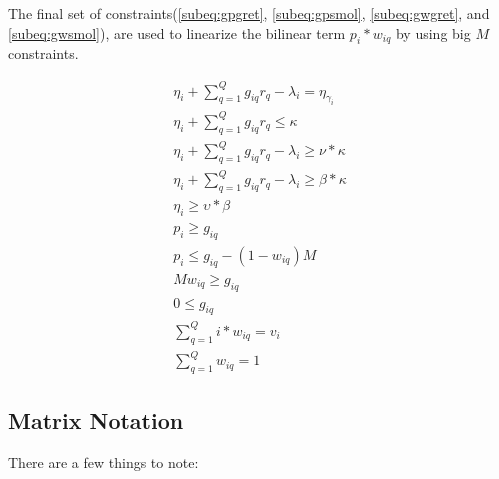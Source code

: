 \documentclass[letterpaper, 10pt, conference]{IEEEtran}
\begin{document}
The final set of constraints(\eqref{subeq:gpgret}, \eqref{subeq:gpsmol}, \eqref{subeq:gwgret}, and \eqref{subeq:gwsmol}), are used to linearize the bilinear term \(p_i*w_{iq}\) by using big \(M\) constraints.

\begin{subequations}
\label{eq:dynconstrs}
\begin{align}
    \eta_i + \sum_{q=1}^Q g_{iq} r_q - \lambda_i = \eta_{\gamma_i}   \label{subeq:next_charge}  \\
    \eta_i + \sum_{q=1}^Q g_{iq} r_q \leq \kappa                     \label{subeq:max_charge}   \\
    \eta_i + \sum_{q=1}^Q g_{iq} r_q - \lambda_i \geq \nu * \kappa   \label{subeq:min_charge}   \\
    \eta_i + \sum_{q=1}^Q g_{iq} r_q - \lambda_i \geq \beta * \kappa \label{subeq:final_charge} \\
    \eta_i \geq \upsilon * \beta                                     \label{subeq:final_charge} \\
    p_i \geq g_{iq}                                                  \label{subeq:gpgret}       \\
    p_i \leq g_{iq} - (1 - w_{iq})M                                  \label{subeq:gpsmol}       \\
    Mw_{iq} \geq g_{iq}                                              \label{subeq:gwgret}       \\
    0 \leq g_{iq}                                                    \label{subeq:gwsmol}       \\
    \sum_{q=1}^Q i*w_{iq} = v_i                                      \label{subeq:wmax}         \\
    \sum_{q=1}^Q w_{iq} = 1                                          \label{subeq:wone}
\end{align}
\end{subequations}

\subsection{Matrix Notation}\label{matrix-notation}

There are a few things to note:
\end{document}
